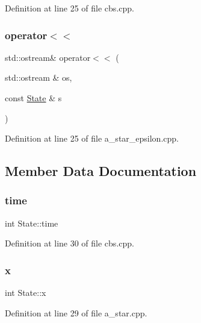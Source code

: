 Definition at line 25 of file cbs.\+cpp.

\mbox{\label{struct_state_a5604754e63c801276d20313c05a68847}} 
\subsubsection{\texorpdfstring{operator$<$$<$}{operator<<}\hspace{0.1cm}{\footnotesize\ttfamily [4/4]}}
{\footnotesize\ttfamily std\+::ostream\& operator$<$$<$ (\begin{DoxyParamCaption}\item[{std\+::ostream \&}]{os,  }\item[{const \hyperlink{struct_state}{State} \&}]{s }\end{DoxyParamCaption})\hspace{0.3cm}{\ttfamily [friend]}}



Definition at line 25 of file a\+\_\+star\+\_\+epsilon.\+cpp.



\subsection{Member Data Documentation}
\mbox{\label{struct_state_a66c39d91e41d0f477758d00af0300a8a}} 
\subsubsection{\texorpdfstring{time}{time}}
{\footnotesize\ttfamily int State\+::time}



Definition at line 30 of file cbs.\+cpp.

\mbox{\label{struct_state_aafa13753373691d8ea3327717c61ef32}} 
\subsubsection{\texorpdfstring{x}{x}}
{\footnotesize\ttfamily int State\+::x}



Definition at line 29 of file a\+\_\+star.\+cpp.

